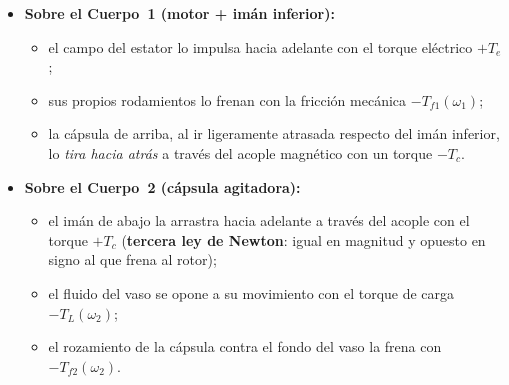\documentclass[11pt,a4paper,oneside]{book}
\begin{document}
\begin{itemize}
  \item \textbf{Sobre el Cuerpo~1 (motor + imán inferior):}
        \begin{itemize}
          \item el campo del estator lo impulsa hacia adelante con el torque
                eléctrico $+T_e$;
          \item sus propios rodamientos lo frenan con la fricción mecánica
                $-T_{f1}(\omega_1)$;
          \item la cápsula de arriba, al ir ligeramente atrasada respecto del
                imán inferior, lo \emph{tira hacia atrás} a través del acople
                magnético con un torque $-T_c$.
        \end{itemize}
  \item \textbf{Sobre el Cuerpo~2 (cápsula agitadora):}
        \begin{itemize}
          \item el imán de abajo la arrastra hacia adelante a través del acople
                con el torque $+T_c$ (\textbf{tercera ley de Newton}: igual en
                magnitud y opuesto en signo al que frena al rotor);
          \item el fluido del vaso se opone a su movimiento con el torque de
                carga $-T_L(\omega_2)$;
          \item el rozamiento de la cápsula contra el fondo del vaso la frena
                con $-T_{f2}(\omega_2)$.
        \end{itemize}
\end{itemize}
\end{document}

